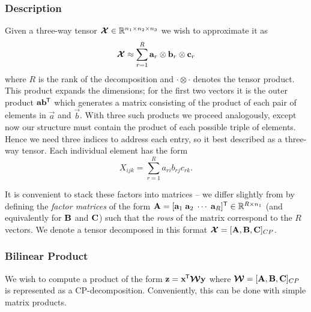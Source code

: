 \subsubsection{Description}
Given a three-way tensor \(\bm{\mathcal{X}} \in \mathbb{R}^{n_1 \times n_2 \times n_3}\) we wish to 
approximate it as
\begin{equation}\label{eq:cp-statement}
	\bm{\mathcal{X}} \approx \sum_{r=1}^{R} \mathbf{a}_r \otimes \mathbf{b}_r \otimes \mathbf{c}_r
\end{equation}
 where \(R\) is the rank of the decomposition and \(\cdot \otimes \cdot\) denotes the tensor
product. This product expands the dimensions; for the first two vectors it is the outer product
\(\mathbf{a}\mathbf{b}^{\mkern-1.5mu\mathsf{T}}\) which generates a matrix consisting of the product of each pair of
elements in \(\vec{a}\) and \(\vec{b}\). With three such products we proceed analogously, except
now our structure must contain the product of each possible triple of elements. Hence we need
three indices to address each entry, so it best described as a three-way tensor. Each individual
element has the form
\begin{equation}\label{eq:cp-element}
	X_{ijk} = \sum_{r=1}^R a_{ri}b_{rj}c_{rk}.
\end{equation}

It is convenient to stack these factors into matrices --
we differ slightly from \autocite{Kolda2009} by defining the \textit{factor matrices} of the 
form \(\mathbf{A} = [\mathbf{a}_1\;\mathbf{a}_2\;\cdots\;\mathbf{a}_R]^{\mathsf{T}} \in 
\mathbb{R}^{R\times n_1}\) (and equivalently for
\(\mathbf{B}\) and \(\mathbf{C}\)) such that the  \textit{rows} of the matrix correspond to the
\(R\) vectors. 
We denote a tensor decomposed in this format 
\(\bm{\mathcal{X}} = [\mathbf{A}, \mathbf{B}, \mathbf{C}]_{CP}\).

\subsubsection{Bilinear Product}
We wish to compute a product of the form \(\mathbf{z} = \mathbf{x}^{\mkern-1.5mu\mathsf{T}}\bm{\mathcal{W}}\mathbf{y}\)
where \(\bm{\mathcal{W}} = [\mathbf{A}, \mathbf{B}, \mathbf{C}]_{CP}\) is represented as a CP-decomposition.
Conveniently, this can be done with simple matrix products.

